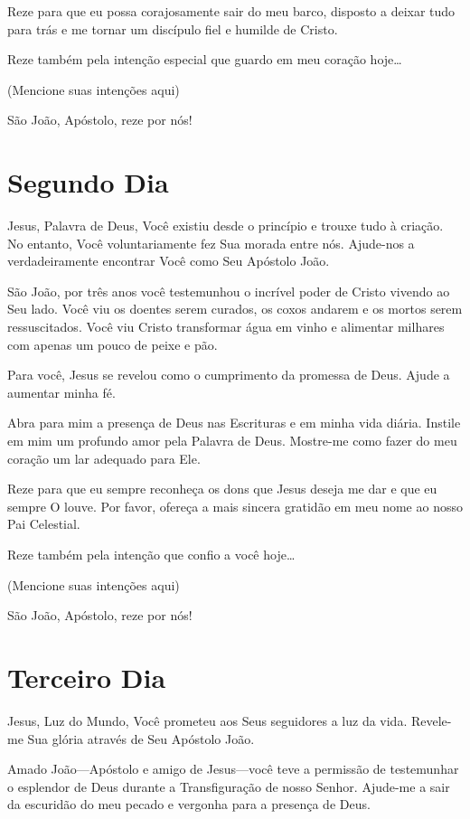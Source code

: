 \documentclass[11pt]{article}
\begin{document}
Reze para que eu possa corajosamente sair do meu barco, disposto a deixar tudo para trás e me tornar um discípulo fiel e humilde de Cristo.

Reze também pela intenção especial que guardo em meu coração hoje…

(Mencione suas intenções aqui)

São João, Apóstolo, reze por nós!


\section{Segundo Dia}

Jesus, Palavra de Deus, Você existiu desde o princípio e trouxe tudo à criação. No entanto, Você voluntariamente fez Sua morada entre nós. Ajude-nos a verdadeiramente encontrar Você como Seu Apóstolo João.

São João, por três anos você testemunhou o incrível poder de Cristo vivendo ao Seu lado. Você viu os doentes serem curados, os coxos andarem e os mortos serem ressuscitados. Você viu Cristo transformar água em vinho e alimentar milhares com apenas um pouco de peixe e pão.

Para você, Jesus se revelou como o cumprimento da promessa de Deus. Ajude a aumentar minha fé.

Abra para mim a presença de Deus nas Escrituras e em minha vida diária. Instile em mim um profundo amor pela Palavra de Deus. Mostre-me como fazer do meu coração um lar adequado para Ele.

Reze para que eu sempre reconheça os dons que Jesus deseja me dar e que eu sempre O louve. Por favor, ofereça a mais sincera gratidão em meu nome ao nosso Pai Celestial.

Reze também pela intenção que confio a você hoje…

(Mencione suas intenções aqui)

São João, Apóstolo, reze por nós!


\section{Terceiro Dia}

Jesus, Luz do Mundo, Você prometeu aos Seus seguidores a luz da vida. Revele-me Sua glória através de Seu Apóstolo João.

Amado João—Apóstolo e amigo de Jesus—você teve a permissão de testemunhar o esplendor de Deus durante a Transfiguração de nosso Senhor. Ajude-me a sair da escuridão do meu pecado e vergonha para a presença de Deus.
\end{document}
